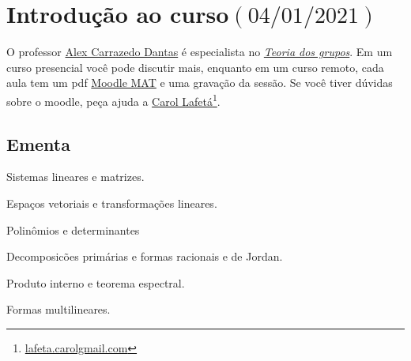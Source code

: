 \chapter*{Introdução ao curso\quad$\left(04/01/2021\right)$}

O professor \href{http://buscatextual.cnpq.br/buscatextual/visualizacv.do?id=K4463841D3}{Alex Carrazedo Dantas} é especialista no \href{https://pt.wikipedia.org/wiki/Teoria_dos_grupos}{
  \emph{Teoria dos grupos}}.
Em um curso presencial você pode discutir mais, enquanto em um curso remoto, cada aula tem um pdf \href{https://moodle.mat.unb.br/20201}{
  Moodle MAT} e uma gravação da sessão.
Se você tiver dúvidas sobre o moodle, peça ajuda a
\href{http://buscatextual.cnpq.br/buscatextual/visualizacv.do?id=K8136975Z1}{Carol Lafetá}\footnote{\href{mailto:lafeta.carol@gmail.com}{lafeta.carol\MVAt gmail.com}}.
\section*{Ementa}

\begin{enumerate}\bfseries
  \begin{multicols}{2}
    \item

    Sistemas lineares e matrizes.

    \item

    Espaços vetoriais e transformações lineares.

    \item

    Polinômios e determinantes

    \item

    Decomposicões primárias e formas racionais e de Jordan.

    \item

    Produto interno e teorema espectral.

    \item

    Formas multilineares.
  \end{multicols}
\end{enumerate}


